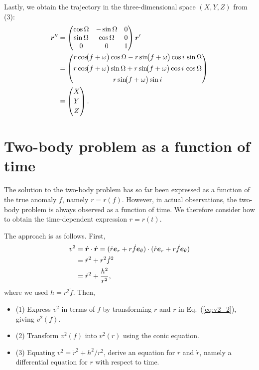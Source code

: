 Lastly, we obtain the trajectory in the three-dimensional space $(X,Y,Z)$ from (3):  
\begin{align}
\boldsymbol{r}^{\prime\prime} &=
\begin{pmatrix}
\cos\Omega & -\sin\Omega & 0\\
\sin\Omega &  \cos\Omega & 0\\
0          &  0          & 1
\end{pmatrix}
\boldsymbol{r}^\prime \\
&=
\begin{pmatrix}
r\cos\!\bigl(f+\omega\bigr)\cos\Omega
 - r\sin\!\bigl(f+\omega\bigr)\cos i\,\sin\Omega\\[4pt]
r\cos\!\bigl(f+\omega\bigr)\sin\Omega
 + r\sin\!\bigl(f+\omega\bigr)\cos i\,\cos\Omega\\[4pt]
r\sin\!\bigl(f+\omega\bigr)\sin i
\end{pmatrix}
\\
\label{eq:threed}
&\equiv
\begin{pmatrix}
X\\[2pt] Y\\[2pt] Z
\end{pmatrix}.
\end{align}

\section{Two-body problem as a function of time}

The solution to the two-body problem has so far been expressed as a function of the true anomaly $f$, namely $r = r(f)$. However, in actual observations, the two-body problem is always observed as a function of time. We therefore consider how to obtain the time-dependent expression $r = r(t)$.

The approach is as follows. First,
\begin{align}
v^2 &= \dot{\boldsymbol{r}} \cdot \dot{\boldsymbol{r}}
= (\dot{r} {\boldsymbol{e}}_r + r \dot{f} {\boldsymbol{e}}_\theta) \cdot (\dot{r} {\boldsymbol{e}}_r + r \dot{f} {\boldsymbol{e}}_\theta) \nonumber \\
\label{eq:v2_1}
&= \dot{r}^2 + r^2 \dot{f}^2 \\
\label{eq:v2_2}
&= \dot{r}^2 + \frac{h^2}{r^2} ,
\end{align}
where we used $h = r^2 \dot{f}$. Then,
\begin{itemize}
\item (1) Express $v^2$ in terms of $f$ by transforming $r$ and $\dot{r}$ in Eq.~(\ref{eq:v2_2}), giving $v^2(f)$.
\item (2) Transform $v^2(f)$ into $v^2(r)$ using the conic equation.
\item (3) Equating $v^2 = \dot{r}^2 + h^2/r^2$, derive an equation for $r$ and $\dot{r}$, namely a differential equation for $r$ with respect to time.
\end{itemize}

